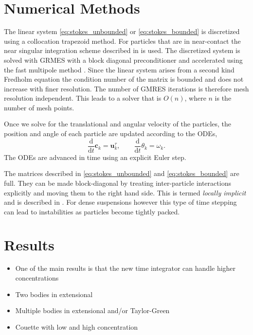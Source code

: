 \documentclass[preprint, 10pt]{elsarticle}
\begin{document}
\section{Numerical Methods\label{s:method}} 

The linear system \eqref{eq:stokes_unbounded} or \eqref{eq:stokes_bounded} is discretized using a collocation trapezoid method. For particles that are in near-contact the near singular integration scheme described in \cite{Quaife2014, Ying2006} is used. The discretized system is solved with GRMES \cite{Saad1986} with a block diagonal preconditioner and accelerated using the fast multipole method \cite{Greengard1987}.  Since the linear system arises from a second kind Fredholm equation the condition number of the matrix is bounded and does not increase with finer resolution. The number of GMRES iterations is therefore mesh resolution independent. This leads to a solver that is $O(n)$, where $n$ is the number of mesh points. 

Once we solve for the translational and angular velocity of the particles, the position and angle of each particle are updated according to the ODEs,
\[ \frac{\text{d}}{\text{d}t}\mathbf{c}_k = \mathbf{u}^\tau_k, \qquad \frac{\text{d}}{\text{d}t}\theta_k =\omega_k.\]
The ODEs are advanced in time using an explicit Euler step. 

The matrices described in \eqref{eq:stokes_unbounded} and \eqref{eq:stokes_bounded} are full. They can be made block-diagonal by treating inter-particle interactions explicitly and moving them to the right hand side. This is termed \textit{locally implicit} and is described in \cite{Lu2017}. For dense suspensions however this type of time stepping can lead to instabilities as particles become tightly packed. 

\section{Results\label{s:results}} 

\begin{itemize}
  \item One of the main results is that the new time integrator can
    handle higher concentrations
  \item Two bodies in extensional
  \item Multiple bodies in extensional and/or Taylor-Green
  \item Couette with low and high concentration
\end{itemize}
\end{document}
